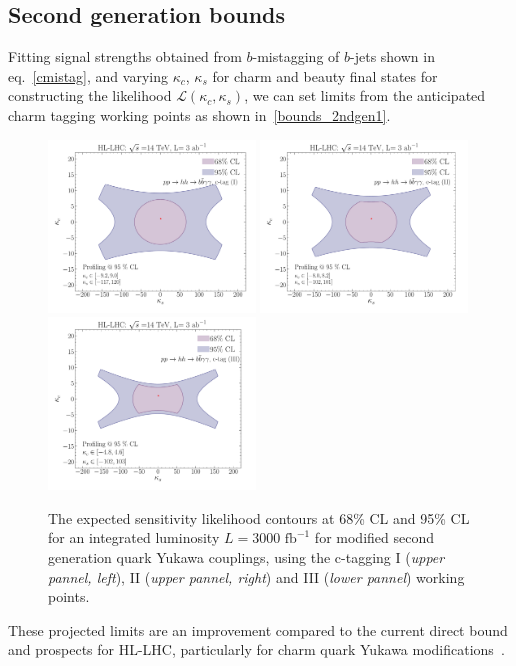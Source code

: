 \subsection{Second generation bounds}
\par Fitting signal strengths obtained from $b$-mistagging of $b$-jets shown in eq.~\eqref{cmistag}, and varying $\kappa_c$,  $\kappa_s$ for charm and beauty final states for constructing the likelihood $\mathscr{L}(\kappa_c,\kappa_s)$, we can set limits from the anticipated charm tagging working points as shown in~\autoref{bounds_2ndgen1}.
\begin{figure}[!t]
	\centering
	\includegraphics[width = 0.49\textwidth]{./fig/2nd_gen_exclusion_ctag1}
	\includegraphics[width = 0.49\textwidth]{./fig/2nd_gen_exclusion_ctag2}
	\centering
	\includegraphics[width = 0.49\textwidth]{./fig/2nd_gen_exclusion_ctag3}
	\caption{The expected sensitivity likelihood contours at 68\% CL and 95\% CL for an integrated luminosity $L=3000\text{ fb}^{-1}$ for modified second generation quark Yukawa couplings, using the c-tagging I (\textit{upper pannel, left}), II (\textit{upper pannel, right}) and III (\textit{lower pannel}) working points. }
	\label{bounds_2ndgen1}
\end{figure}
These projected limits are an improvement compared to the current direct bound and prospects for HL-LHC, particularly for charm quark Yukawa modifications~\cite{Perez:2015aoa,Perez:2015lra}.
